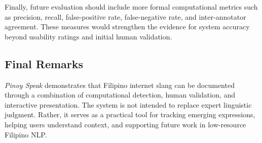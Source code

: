 Finally, future evaluation should include more formal computational metrics such as precision, recall, false-positive rate, false-negative rate, and inter-annotator agreement. These measures would strengthen the evidence for system accuracy beyond usability ratings and initial human validation.

\subsection{Final Remarks}
\textit{Pinoy Speak} demonstrates that Filipino internet slang can be documented through a combination of computational detection, human validation, and interactive presentation. The system is not intended to replace expert linguistic judgment. Rather, it serves as a practical tool for tracking emerging expressions, helping users understand context, and supporting future work in low-resource Filipino NLP.